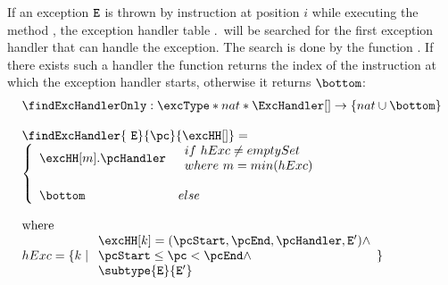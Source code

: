  If an exception $\mbox{\rm\texttt{E}}$ is thrown by instruction at position $i$ while executing the method \methodd,
 the exception handler table  \methodd.\excHandlerTable \ will be searched for the first exception handler that can handle the exception. 
 The search is done by the function \findExcHandlerOnly. If there exists 
 such a handler the function returns the index of the instruction at which the exception handler starts, otherwise it returns $\bottom$:
 $$ \begin{array}{l}
        \findExcHandlerOnly : \excType * nat * \ExcHandler[] \rightarrow  \{ nat \cup \bottom \}\\
	\\
	\findExcHandler{ \mbox{ \rm \texttt{E}} }{\pc}{\excHH[]} = \\
	 \left\{\begin{array}{ll}
	     \excHH[m].\pcHandler & \begin{array}{l}
	          		         if  \  hExc \neq emptySet \\
					 where \  m = min( hExc ) 
			            \end{array}	 \\
			   & \\
	     \bottom &  else %
	 \end{array}\right. \\
\\ 
 \rm{where } \\  
  hExc = \{ k  \mid  \begin{array}{l} 
                        \excHH[k] = (\pcStart,\pcEnd,\pcHandler, \mbox{\rm\texttt{E}}' ) \wedge  \\
                        \pcStart \leq \pc < \pcEnd \wedge \\
			 \subtype{\mbox{\rm\texttt{E}}}{\mbox{\rm\texttt{E}}'} 
                    \end{array} \}
   \end{array}	  
 $$

